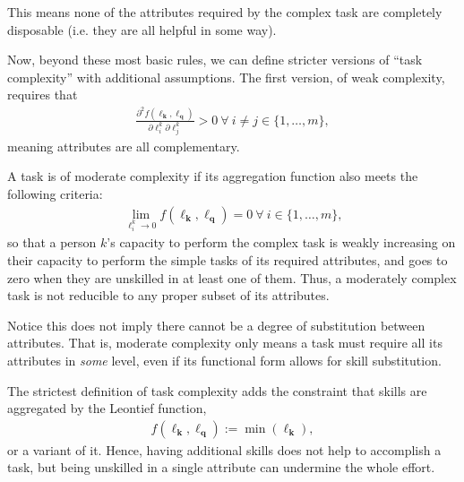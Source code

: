 \documentclass[hidelinks, nonatbib]{elsarticle}
\begin{document}
\begin{definition}
    This means none of the attributes required by the complex task are completely disposable (i.e. they are all helpful in some way).
    
    \begin{subdefinition}
        Now, beyond these most basic rules, we can define stricter versions of ``task complexity'' with additional assumptions. The first version, of weak complexity, requires that
        \begin{gather}
            \frac{
                \partial ^ 2 {
                    f(\boldsymbol{\ell_k}, \boldsymbol{\ell_q})
                }
            }{
                \partial 
                \ell_{i}^{k}
                \partial
                \ell_{j}^{k}
            }
            > 0
            \
            \forall
            \
            i \neq j \in \{1, \dots, m\}
            ,
        \end{gather}
        meaning attributes are all complementary.
    \end{subdefinition}
    
    \begin{subdefinition}
        A task is of moderate complexity if its aggregation function also meets the following criteria:
        \begin{gather}
            \lim_{
                \ell_{i}^{k}
                \rightarrow 0
            }{
                f(\boldsymbol{\ell_k}, \boldsymbol{\ell_q})
            }
            = 0
            \
            \forall 
            \
            i \in \{1, \dots, m\}
            ,
        \end{gather}
        so that a person $k$'s capacity to perform the complex task is weakly increasing on their capacity to perform the simple tasks of its required attributes, and goes to zero when they are unskilled in at least one of them. Thus, a moderately complex task is not reducible to any proper subset of its attributes.
        
        Notice this does not imply there cannot be a degree of substitution between attributes. That is, moderate complexity only means a task must require all its attributes in \textit{some} level, even if its functional form allows for skill substitution.
    \end{subdefinition}
    
    \begin{subdefinition}[Strong Complexity]
        The strictest definition of task complexity adds the constraint that skills are aggregated by the Leontief function,
        \begin{gather}
            f(\boldsymbol{\ell_k}, \boldsymbol{\ell_q})
            :=
            \min(\boldsymbol{\ell_k})
            ,
        \end{gather}
        or a variant of it. Hence, having additional skills does not help to accomplish a task, but being unskilled in a single attribute can undermine the whole effort.
    \end{subdefinition}

\end{definition}
\end{document}
